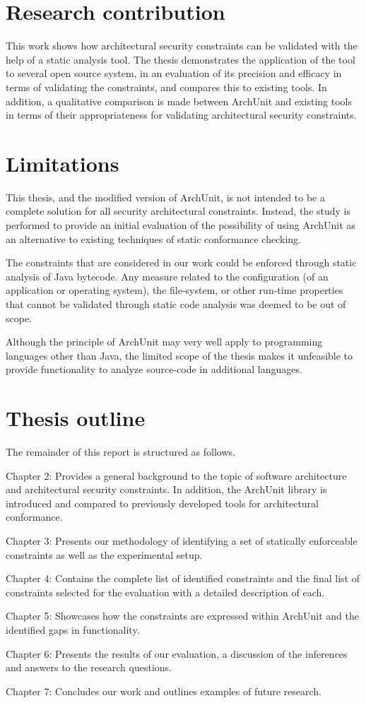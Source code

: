 \section{Research contribution}
This work shows how architectural security constraints can be validated with the help of a static analysis tool. The thesis demonstrates the application of the tool to several open source system, in an evaluation of its precision and efficacy in terms of validating the constraints, and compares this to existing tools. In addition, a qualitative comparison is made between ArchUnit and existing tools in terms of their appropriateness for validating architectural security constraints.

\section{Limitations}
\label{sec:limitations}

This thesis, and the modified version of ArchUnit, is not intended to be a complete solution for all security architectural constraints. Instead, the study is performed to provide an initial evaluation of the possibility of using ArchUnit as an alternative to existing techniques of static conformance checking. 

The constraints that are considered in our work could be enforced through static analysis of Java bytecode. Any measure related to the configuration (of an application or operating system), the file-system, or other run-time properties that cannot be validated through static code analysis was deemed to be out of scope. 

Although the principle of ArchUnit may very well apply to programming languages other than Java, the limited scope of the thesis makes it unfeasible to provide functionality to analyze source-code in additional languages.

\section{Thesis outline}

The remainder of this report is structured as follows.

Chapter 2: Provides a general background to the topic of software architecture and architectural security constraints. In addition, the ArchUnit library is introduced and compared to previously developed tools for architectural conformance.  

Chapter 3: Presents our methodology of identifying a set of statically enforceable constraints as well as the experimental setup. 

Chapter 4: Contains the complete list of identified constraints and the final list of constraints selected for the evaluation with a detailed description of each. 

Chapter 5: Showcases how the constraints are expressed within ArchUnit and the identified gaps in functionality.

Chapter 6: Presents the results of our evaluation, a discussion of the inferences and answers to the research questions. 

Chapter 7: Concludes our work and outlines examples of future research.